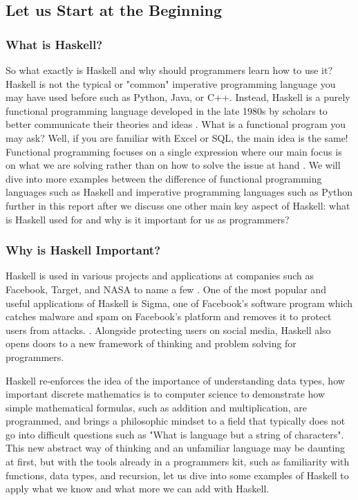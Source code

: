 \documentclass{article}
\begin{document}
\subsection{Let us Start at the Beginning}

\subsubsection{What is Haskell?}
So what exactly is Haskell and why should programmers learn how to use it? Haskell is not the typical or "common" imperative programming language you may have used before such as Python, Java, or C++. Instead, Haskell is a purely functional programming language developed in the late 1980s by scholars to better communicate their theories and ideas \cite{UPenn}. What is a functional program you may ask? Well, if you are familiar with Excel or SQL, the main idea is the same! Functional programming focuses on a single expression where our main focus is on what we are solving rather than on how to solve the issue at hand \cite{Haskell.org}. We will dive into more examples between the difference of functional programming languages such as Haskell and imperative programming languages such as Python further in this report after we discuss one other main key aspect of Haskell: what is Haskell used for and why is it important for us as programmers?

\medskip\noindent
\subsubsection{Why is Haskell Important?}
Haskell is used in various projects and applications at companies such as Facebook, Target, and NASA to name a few \cite{serokell.io}. One of the most popular and useful applications of Haskell is Sigma, one of Facebook's software program which catches malware and spam on Facebook's platform and removes it to protect users from attacks. \cite{Facebook Engineering}. Alongside protecting users on social media, Haskell also opens doors to a new framework of thinking and problem solving for programmers. 

\medskip\noindent
Haskell re-enforces the idea of the importance of understanding data types, how important discrete mathematics is to computer science to demonstrate how simple mathematical formulas, such as addition and multiplication, are programmed, and brings a philosophic mindset to a field that typically does not go into difficult questions such as "What is language but a string of characters". This new abstract way of thinking and an unfamiliar language may be daunting at first, but with the tools already in a programmers kit, such as familiarity with functions, data types, and recursion, let us dive into some examples of Haskell to apply what we know and what more we can add with Haskell.
\end{document}
